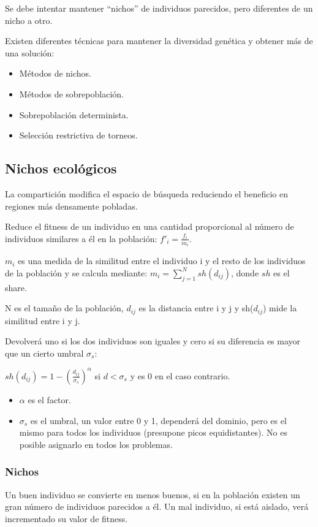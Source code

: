 \documentclass[12pt, twoside, openright]{report} %
\begin{document}
Se debe intentar mantener “nichos” de individuos parecidos, pero diferentes de un nicho a otro.

Existen diferentes técnicas para mantener la diversidad genética y obtener más de una solución:
\begin{itemize}
	\item Métodos de nichos.
	\item Métodos de sobrepoblación.
	\item Sobrepoblación determinista.
	\item Selección restrictiva de torneos.
\end{itemize}

\subsection{Nichos ecológicos}
La compartición modifica el espacio de búsqueda reduciendo el beneficio en regiones más densamente pobladas.

Reduce el fitness de un individuo en una cantidad proporcional al número de individuos similares a él en la población: $f'_i=\frac{f_i}{m_i}$.

$m_i$ es una medida de la similitud entre el individuo i y el resto de los individuos de la población y se calcula mediante: $m_i= \sum^N_{j=1}sh(d_{ij})$, donde $sh$ es el share.

N es el tamaño de la población, $d_{ij}$ es la distancia entre i y j y sh($d_{ij}$) mide la similitud entre i y j.
\pagebreak

Devolverá uno si los dos individuos son iguales y cero si su diferencia es mayor que un cierto umbral $\sigma_s$:

$sh(d_{ij}) = 1- \left( \frac{d_{ij}}{\sigma_s} \right)^\alpha$ si $d<\sigma_s$ y es 0 en el caso contrario. 
\begin{itemize}
	\item $\alpha$ es el factor.
	\item $\sigma_s$ es el umbral, un valor entre 0 y 1, dependerá del dominio, pero es el mismo para todos los individuos (presupone picos equidistantes). No es posible asignarlo en todos los problemas.
\end{itemize}

\subsubsection{Nichos}
Un buen individuo se convierte en menos buenos, si en la población existen un gran número de individuos parecidos a él. Un mal individuo, si está aislado, verá incrementado su valor de fitness.
\end{document}
